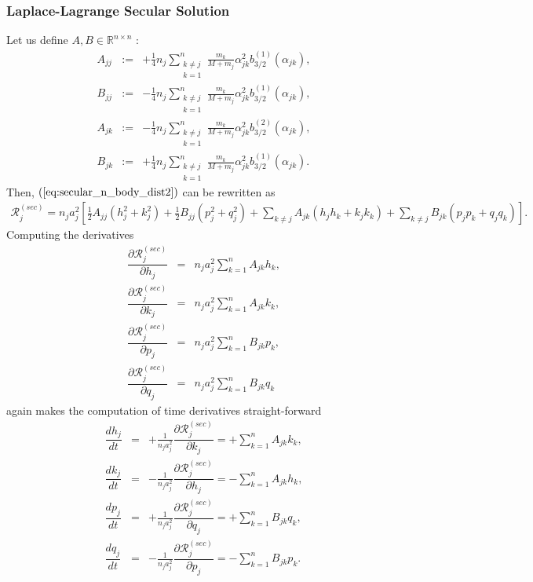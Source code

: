 \documentclass [12pt, a4paper] {article}
\newcommand{\pdiff}[2]
{
	\dfrac{\partial #1}{\partial #2}
}
\newcommand{\diff}[2]
{
	\dfrac{d #1}{d #2}
}
\begin{document}
\subsubsection{Laplace-Lagrange Secular Solution}
Let us define $A, B\in\mathbb{R}^{n\times n}$ :
\begin {eqnarray}
    A_{jj} 
    &:=& 
    +\frac{1}{4}n_j
    \sum_{\substack{k\neq j\\k=1}}^n
    \frac{m_k}{M + m_j}\alpha_{jk}^2b_{3/2}^{(1)}(\alpha_{jk}),
    \\
    B_{jj}
    &:=& 
    -\frac{1}{4}n_j
    \sum_{\substack{k\neq j\\k=1}}^n
    \frac{m_k}{M + m_j}\alpha_{jk}^2b_{3/2}^{(1)}(\alpha_{jk}),
    \\
    A_{jk}
    &:=& 
    -\frac{1}{4}n_j
    \sum_{\substack{k\neq j\\k=1}}^n
    \frac{m_k}{M + m_j}\alpha_{jk}^2b_{3/2}^{(2)}(\alpha_{jk}),
    \\
    B_{jk}
    &:=& 
    +\frac{1}{4}n_j
    \sum_{\substack{k\neq j\\k=1}}^n
    \frac{m_k}{M + m_j}\alpha_{jk}^2b_{3/2}^{(1)}(\alpha_{jk}).
\end {eqnarray}
Then, $(\ref{eq:secular_n_body_dist2})$ can be rewritten as 
\begin {eqnarray}
    \mathcal{R}_j^{(sec)}
    =
    n_ja_j^2
    \left[
        \frac{1}{2}A_{jj}(h_j^2 + k_j^2)
        + 
        \frac{1}{2}B_{jj}(p_j^2 + q_j^2)
        +
        \sum_{k\neq j}A_{jk}(h_jh_k + k_jk_k)
        +
        \sum_{k\neq j}B_{jk}(p_jp_k + q_jq_k)
    \right].
\end {eqnarray}
Computing the derivatives 
\begin {eqnarray}
    \pdiff{\mathcal{R}_j^{(sec)}}{h_j} 
    &=&
    n_ja_j^2
    \sum_{k=1}^{n}
    A_{jk}h_k,
    \\
    \pdiff{\mathcal{R}_j^{(sec)}}{k_j} 
    &=&
    n_ja_j^2
    \sum_{k=1}^{n}
    A_{jk}k_k,
    \\
    \pdiff{\mathcal{R}_j^{(sec)}}{p_j} 
    &=&
    n_ja_j^2
    \sum_{k=1}^{n}
    B_{jk}p_k,
    \\
    \pdiff{\mathcal{R}_j^{(sec)}}{q_j} 
    &=&
    n_ja_j^2
    \sum_{k=1}^{n}
    B_{jk}q_k
\end {eqnarray}
again makes the computation of time derivatives straight-forward 
\begin {eqnarray}
    \diff{h_j}{t}
    &=& 
    +\frac{1}{n_ja_j^2}\pdiff{\mathcal{R}_j^{(sec)}}{k_j}
    = 
    +\sum_{k=1}^{n}
    A_{jk}k_k,
    \\
    \diff{k_j}{t}
    &=& 
    -\frac{1}{n_ja_j^2}\pdiff{\mathcal{R}_j^{(sec)}}{h_j}
    = 
    -\sum_{k=1}^{n}
    A_{jk}h_k,
    \\
    \diff{p_j}{t}
    &=& 
    +\frac{1}{n_ja_j^2}\pdiff{\mathcal{R}_j^{(sec)}}{q_j}
    = 
    +\sum_{k=1}^{n}
    B_{jk}q_k,
    \\
    \diff{q_j}{t}
    &=& 
    -\frac{1}{n_ja_j^2}\pdiff{\mathcal{R}_j^{(sec)}}{p_j}
    = 
    -\sum_{k=1}^{n}
    B_{jk}p_k.
\end {eqnarray}
\end{document}
